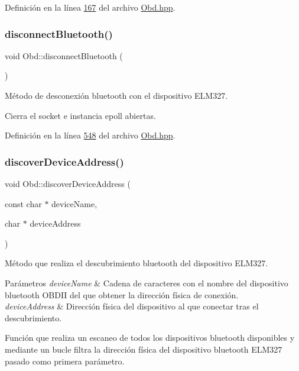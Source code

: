 Definición en la línea \hyperlink{Obd_8hpp_source_l00167}{167} del archivo \hyperlink{Obd_8hpp_source}{Obd.\+hpp}.

\mbox{\label{classObd_a95d02f8f3c48557c5ad799ecb6dd7f79}} 
\subsubsection{\texorpdfstring{disconnect\+Bluetooth()}{disconnectBluetooth()}}
{\footnotesize\ttfamily void Obd\+::disconnect\+Bluetooth (\begin{DoxyParamCaption}{ }\end{DoxyParamCaption})\hspace{0.3cm}{\ttfamily [inline]}}



Método de desconexión bluetooth con el dispositivo E\+L\+M327. 

Cierra el socket e instancia epoll abiertas. 

Definición en la línea \hyperlink{Obd_8hpp_source_l00548}{548} del archivo \hyperlink{Obd_8hpp_source}{Obd.\+hpp}.

\mbox{\label{classObd_a59676f3fa1fd3052216b55be0a79c474}} 
\subsubsection{\texorpdfstring{discover\+Device\+Address()}{discoverDeviceAddress()}}
{\footnotesize\ttfamily void Obd\+::discover\+Device\+Address (\begin{DoxyParamCaption}\item[{const char $\ast$}]{device\+Name,  }\item[{char $\ast$}]{device\+Address }\end{DoxyParamCaption})\hspace{0.3cm}{\ttfamily [inline]}}



Método que realiza el descubrimiento bluetooth del dispositivo E\+L\+M327. 


\begin{DoxyParams}{Parámetros}
{\em device\+Name} & Cadena de caracteres con el nombre del dispositivo bluetooth O\+B\+D\+II del que obtener la dirección física de conexión. \\
\hline
{\em device\+Address} & Dirección física del dispositivo al que conectar tras el descubrimiento.\\
\hline
\end{DoxyParams}
Función que realiza un escaneo de todos los dispositivos bluetooth disponibles y mediante un bucle filtra la dirección física del dispositivo bluetooth E\+L\+M327 pasado como primera parámetro. 

